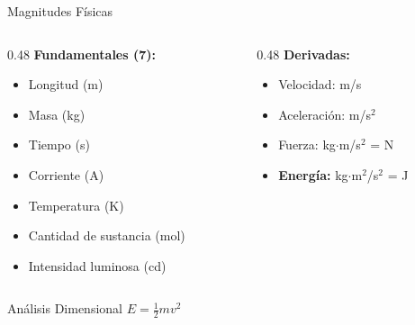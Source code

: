 \documentclass[aspectratio=169,xcolor=dvipsnames]{beamer}
\begin{document}
\begin{frame}{Magnitudes Físicas}
	\begin{columns}[T]
		\begin{column}{0.48\textwidth}
			\textbf{Fundamentales (7):}
			\begin{itemize}
				\item Longitud (m)
				\item Masa (kg)
				\item Tiempo (s)
				\item Corriente (A)
				\item Temperatura (K)
				\item Cantidad de sustancia (mol)
				\item Intensidad luminosa (cd)
			\end{itemize}
		\end{column}
		\begin{column}{0.48\textwidth}
			\textbf{Derivadas:}
			\begin{itemize}
				\item Velocidad: m/s
				\item Aceleración: m/s$^2$
				\item Fuerza: kg$\cdot$m/s$^2$ = N
				\item \textbf{Energía:} kg$\cdot$m$^2$/s$^2$ = J
			\end{itemize}
		\end{column}
	\end{columns}
	
	\vspace{0.2cm}
	\begin{exampleblock}{Análisis Dimensional}
		$E = \frac{1}{2}mv^2 $ \checkmark
	\end{exampleblock}
\end{frame}
\end{document}
